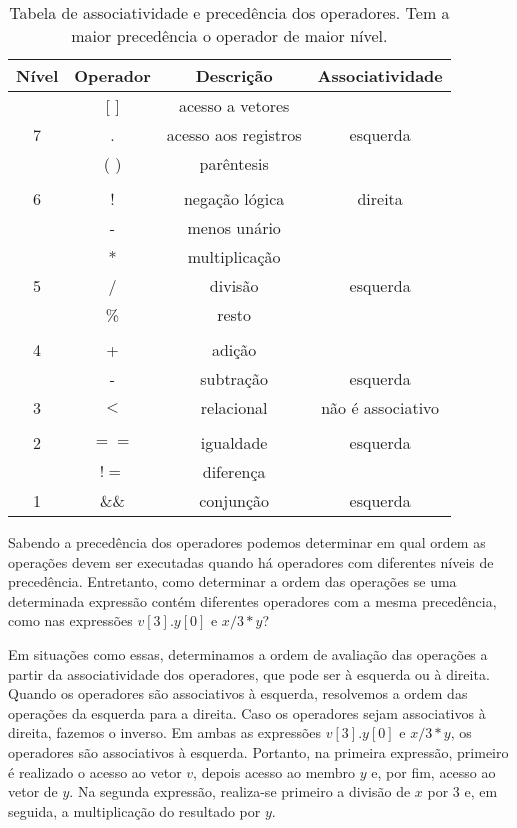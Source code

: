 \documentclass[a4paper,11pt]{article}
\begin{document}
\setcounter{table}{0}
\captionsetup[table]{name=Tabela}
\begin{table}
\begin{center}
\begin{tabular}{|c|c|c|c|}
  \hline \bf Nível & \bf Operador & \bf Descrição & \bf Associatividade \\
  \hline & [ ] & acesso a vetores &  \\
  7 &  . & acesso aos registros & esquerda \\
  & ( ) & parêntesis &  \\
  \hline   & & & \\
         6 & ! & negação lógica & direita \\
           & - & menos unário & \\
  \hline  & * & multiplicação  &  \\
        5 & / & divisão & esquerda \\
          & \% & resto &  \\
  \hline  & & & \\
         4 & + & adição & \\
           & - & subtração & esquerda \\
  \hline 3 & $<$ & relacional & não é associativo \\
  \hline   & & & \\
         2 & $==$ & igualdade & esquerda \\
           & $!=$ & diferença & \\
  \hline 1 & \&\& & conjunção & esquerda \\
  \hline
\end{tabular}
\caption{Tabela de associatividade e precedência dos operadores. Tem a maior precedência o operador de maior nível.}
\label{tab:prece}
\end{center}
\end{table}

Sabendo a precedência dos operadores podemos determinar em qual ordem as operações devem ser executadas quando há
operadores com diferentes níveis de precedência. Entretanto, como determinar a ordem das operações se uma determinada
expressão contém diferentes operadores com a mesma precedência, como nas expressões \(v[3].y[0]\) e \(x/3*y\)?

Em situações como essas, determinamos a ordem de avaliação das operações a partir da associatividade dos operadores,
que pode ser à esquerda ou à direita. Quando os operadores são associativos à esquerda, resolvemos a ordem das operações
da esquerda para a direita. Caso os operadores sejam associativos à direita, fazemos o inverso.
Em ambas as expressões \(v[3].y[0]\) e \(x/3*y\), os operadores são associativos à esquerda.
Portanto, na primeira expressão, primeiro é realizado o acesso ao vetor \(v\), depois acesso ao membro \(y\) e, por fim,
acesso ao vetor de \(y\). Na segunda expressão, realiza-se primeiro a divisão de \(x\) por 3 e, em seguida, a multiplicação
do resultado por \(y\).
\end{document}
